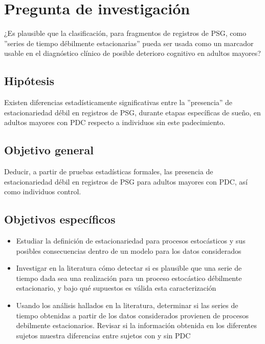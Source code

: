 \documentclass[12pt,a4paper]{mitthesis}
\begin{document}

\section{Pregunta de investigaci\'on}

¿Es plausible que la clasificaci\'on, para fragmentos de registros de PSG, como ''series de tiempo 
d\'ebilmente estacionarias'' pueda ser usada como un marcador usable en el diagn\'ostico cl\'inico
de posible deterioro cognitivo en adultos mayores?


\subsection{Hip\'otesis}

Existen diferencias estad\'isticamente significativas entre la ''presencia'' de estacionariedad 
d\'ebil en registros de PSG, durante etapas espec\'ificas de sue\~no, en adultos mayores con PDC 
respecto a individuos sin este padecimiento.


\subsection{Objetivo general}

Deducir, a partir de pruebas estad\'isticas formales, las presencia de estacionariedad d\'ebil en
registros de PSG para adultos mayores con PDC, as\'i como individuos control.


\subsection{Objetivos espec\'ificos}

\begin{itemize}
\item Estudiar la definici\'on de estacionariedad para procesos estoc\'asticos y sus posibles 
consecuencias dentro de un modelo para los datos considerados

\item Investigar en la literatura c\'omo detectar si es plausible que una serie de tiempo dada sea 
una realizaci\'on para un proceso estoc\'astico d\'ebilmente estacionario, y bajo qu\'e supuestos 
es v\'alida esta caracterizaci\'on

\item Usando los an\'alisis hallados en la literatura, determinar si las series de tiempo 
obtenidas a partir de los datos considerados provienen de procesos debilmente estacionarios.
Revisar si la informaci\'on obtenida en los diferentes sujetos muestra diferencias entre sujetos 
con y sin PDC
\end{itemize}
\end{document}
